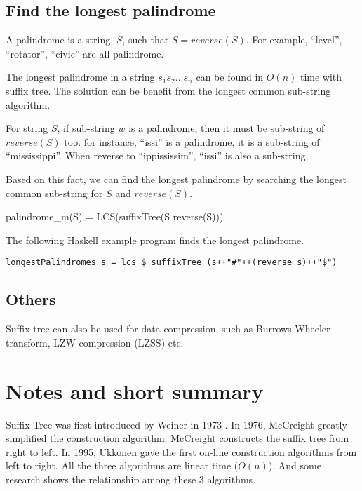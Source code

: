 \documentclass{article}
\begin{document}
\subsection{Find the longest palindrome}

A palindrome is a string, $S$, such that $S=reverse(S)$. For example,
``level'', ``rotator'', ``civic'' are all palindrome.

The longest palindrome in a string $s_1s_2...s_n$ can be found in
$O(n)$ time with suffix tree. The solution can be benefit from the
longest common sub-string algorithm.

For string $S$, if sub-string $w$ is a palindrome, then it must be
sub-string of $reverse(S)$ too. for instance, ``issi'' is a palindrome,
it is a sub-string of ``mississippi''. When reverse to
``ippississim'', ``issi'' is also a sub-string.

Based on this fact, we can find the longest palindrome by
searching the longest common sub-string for $S$ and $reverse(S)$.

\be
palindrome_m(S) = LCS(suffixTree(S \cup reverse(S)))
\ee

The following Haskell example program finds the longest palindrome.

\lstset{language=Haskell}
\begin{lstlisting}
longestPalindromes s = lcs $ suffixTree (s++"#"++(reverse s)++"$")
\end{lstlisting}

\subsection{Others}
Suffix tree can also be used for data compression, such as Burrows-Wheeler
transform, LZW compression (LZSS) etc. \cite{wiki-suffix-tree}

\section{Notes and short summary}

Suffix Tree was first introduced by Weiner in 1973 \cite{weiner73}.
In 1976, McCreight greatly simplified the construction algorithm.
McCreight constructs the suffix tree from right to left. In 1995,
Ukkonen gave the first on-line construction algorithms from
left to right. All the three algorithms are linear time ($O(n)$).
And some research shows the relationship among these 3 algorithms.
\cite{GieKur97}
\end{document}
